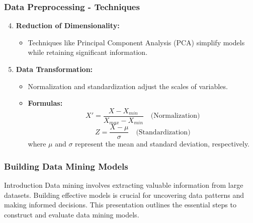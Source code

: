 \documentclass{beamer}
\begin{document}
\begin{frame}[fragile]
    \frametitle{Data Preprocessing - Techniques}
    \begin{enumerate}
        \setcounter{enumi}{3} %
        \item \textbf{Reduction of Dimensionality:} 
            \begin{itemize}
                \item Techniques like Principal Component Analysis (PCA) simplify models while retaining significant information.
            \end{itemize}
        
        \item \textbf{Data Transformation:}
            \begin{itemize}
                \item Normalization and standardization adjust the scales of variables.
                \item \textbf{Formulas:}
                \begin{equation}
                X' = \frac{X - X_{min}}{X_{max} - X_{min}} \quad \text{(Normalization)}
                \end{equation}
                \begin{equation}
                Z = \frac{X - \mu}{\sigma} \quad \text{(Standardization)}
                \end{equation}
                where \( \mu \) and \( \sigma \) represent the mean and standard deviation, respectively.
            \end{itemize}
    \end{enumerate}
\end{frame}

\begin{frame}
    \frametitle{Building Data Mining Models}
    \begin{block}{Introduction}
        Data mining involves extracting valuable information from large datasets. 
        Building effective models is crucial for uncovering data patterns and making informed decisions.
        This presentation outlines the essential steps to construct and evaluate data mining models.
    \end{block}
\end{frame}
\end{document}
